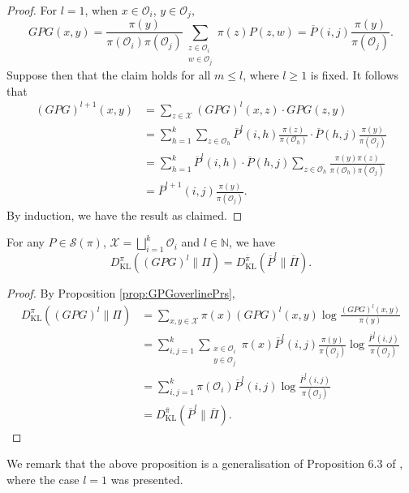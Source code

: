 \documentclass[EJP]{ejpecp} %
\begin{document}
\begin{proof}
    For $l = 1$, when  $x \in \mathcal{O}_i$, $y \in \mathcal{O}_j,$
    $$GPG(x,y) = \frac{\pi(y)}{\pi(\mathcal{O}_i)\pi(\mathcal{O}_j)} \sum_{\substack{z \in \mathcal{O}_i\\ w \in \mathcal{O}_j}} \pi(z) P(z,w) = \overline{P} (i,j) \frac{\pi(y)}{\pi(\mathcal{O}_j)}.$$
    Suppose then that the claim holds for all $m \leq  l$, where $l \geq 1$ is fixed. 
    It follows that 
    \begin{align*}
        (GPG)^{l+1}(x,y) &= \sum_{z \in \mathcal{X}} (GPG)^l(x,z)\cdot GPG(z,y)\\
        &= \sum_{h=1}^k \sum_{z \in \mathcal{O}_h} \overline{P}^l (i,h) \frac{\pi(z)}{\pi(\mathcal{O}_h)} \cdot \overline{P}(h,j) \frac{\pi(y)}{\pi(\mathcal{O}_j)}\\
        &= \sum_{h=1}^k \overline{P}^l (i,h)\cdot \overline{P}(h,j) \sum_{z \in \mathcal{O}_h} \frac{\pi(y)\pi(z)}{\pi(\mathcal{O}_h)\pi(\mathcal{O}_j)}\\
        &= \overline{P}^{l+1}(i,j) \frac{\pi(y)}{\pi(\mathcal{O}_j)}.
    \end{align*}
    By induction, we have the result as claimed.
\end{proof}

\begin{proposition} \label{prop:GPGoverlineP KL}
    For any $P \in \mathcal{S}(\pi)$, $\mathcal{X} = \bigsqcup_{i=1}^k \mathcal{O}_i$ and $l \in \mathbb{N}$, we have
    $$D_{\mathrm{KL}}^\pi \left((GPG)^l \| \Pi \right) = D_{\mathrm{KL}}^{\overline\pi} \left( \overline{P}^l \| \overline{\Pi}\right).$$
\end{proposition}

\begin{proof}
    By Proposition \ref{prop:GPGoverlinePrs}, 
    \begin{align*}
        D_{\mathrm{KL}}^\pi \left((GPG)^l \| \Pi \right) &= \sum_{x,y \in \mathcal{X}} \pi(x) (GPG)^l(x,y) \log \frac{(GPG)^l(x,y)}{\pi(y)}\\
        &= \sum_{i,j=1}^k \sum_{\substack{x \in \mathcal{O}_i\\ y \in \mathcal{O}_j}} \pi(x) \overline{P}^l(i,j) \frac{\pi(y)}{\pi(\mathcal{O}_j)} \log \frac{\overline{P}^l(i,j)}{\pi(\mathcal{O}_j)}\\
        &= \sum_{i,j=1}^k \pi(\mathcal{O}_i) \overline{P}^l(i,j) \log \frac{\overline{P}^l(i,j)}{\pi(\mathcal{O}_j)}\\
        &= D_{\mathrm{KL}}^{\overline\pi} \left( \overline{P}^l \| \overline{\Pi}\right).
    \end{align*}
\end{proof}
We remark that the above proposition is a generalisation of Proposition 6.3 of \cite{GPG}, where the case $l=1$ was presented.
\end{document}
